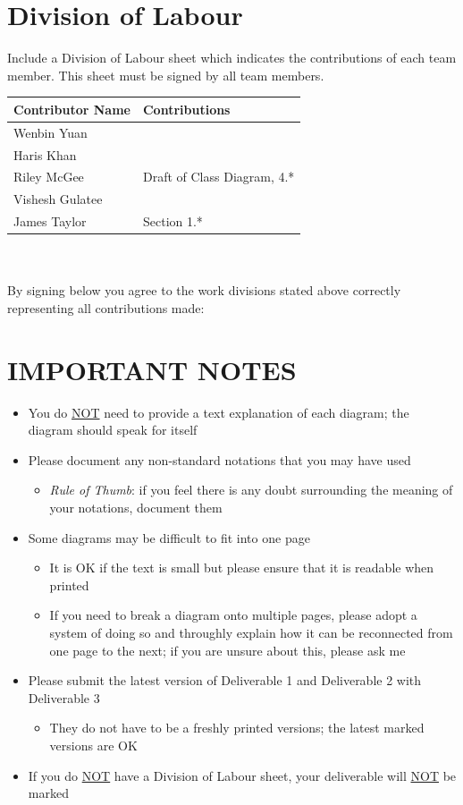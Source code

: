\documentclass[]{article}
\begin{document}
\newpage

\appendix
\section{Division of Labour}
\label{sec:division_of_labour}
Include a Division of Labour sheet which indicates the contributions of each team member. This sheet must be signed by all team members.


\begin{tabular}{ | l | l | }
\hline
	\textbf{Contributor Name} & \textbf{Contributions}  \\
  	\hline
  	Wenbin Yuan &  \\
  	\hline
  	Haris Khan &  \\
  	\hline
		Riley McGee & Draft of Class Diagram, 4.* \\
  	\hline
		Vishesh Gulatee &  \\
  	\hline
		James Taylor & Section 1.* \\
  	\hline
\end{tabular}
\\
\\
By signing below you agree to the work divisions stated above correctly representing all contributions made:



\newpage
\section*{IMPORTANT NOTES}
\begin{itemize}
	\item You do \underline{NOT} need to provide a text explanation of each diagram; the diagram should speak for itself
	\item Please document any non-standard notations that you may have used
	\begin{itemize}
		\item \emph{Rule of Thumb}: if you feel there is any doubt surrounding the meaning of your notations, document them
	\end{itemize}
	\item Some diagrams may be difficult to fit into one page
	\begin{itemize}
		\item It is OK if the text is small but please ensure that it is readable when printed
		\item If you need to break a diagram onto multiple pages, please adopt a system of doing so and throughly explain how it can be reconnected from one page to the next; if you are unsure about this, please ask me
	\end{itemize}
	\item Please submit the latest version of Deliverable 1 and Deliverable 2 with Deliverable 3
	\begin{itemize}
		\item They do not have to be a freshly printed versions; the latest marked versions are OK
	\end{itemize}
	\item If you do \underline{NOT} have a Division of Labour sheet, your deliverable will \underline{NOT} be marked
\end{itemize}
\end{document}
